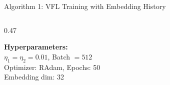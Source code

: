 \documentclass[aspectratio=169, 11pt]{beamer}
\begin{document}
\begin{frame}{Algorithm 1: VFL Training with Embedding History}
\begin{columns}[T]
\begin{column}{0.47\textwidth}
\begin{center}
      \end{center}
      \vspace{0.2cm}
      \footnotesize
      \textbf{Hyperparameters:}\\
      $\eta_1 = \eta_2 = 0.01$, Batch $= 512$\\
      Optimizer: RAdam, Epochs: 50\\
      Embedding dim: 32
    \end{column}
  \end{columns}
\end{frame}

\end{document}
